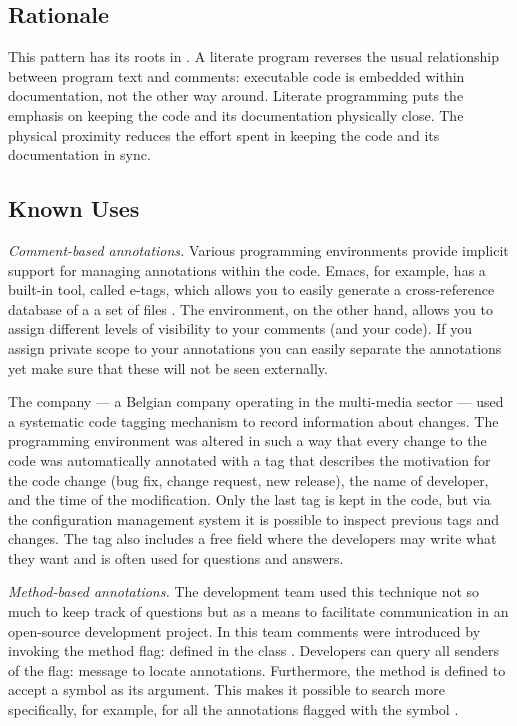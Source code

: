 \documentclass[a4paper,10pt,twoside]{book}
\begin{document}
\subsection*{Rationale}

This pattern has its roots in  \cite{Reen89a}\cite{Knut92a}. A literate program reverses the usual relationship between program text and comments: executable code is embedded within documentation, not the other way around. Literate programming puts the emphasis on keeping the code and its documentation physically close. The physical proximity reduces the effort spent in keeping the code and its documentation in sync.

\subsection*{Known Uses}

\emph{Comment-based annotations.}
Various programming environments provide implicit support for managing annotations within the code. Emacs, for example, has a built-in tool, called e-tags, which allows you to easily generate a cross-reference database of a a set of files \cite{Came96a}. The  environment, on the other hand, allows you to assign different levels of visibility to your comments (and your code). If you assign private scope to your annotations you can easily separate the annotations yet make sure that these will not be seen externally.

The company  --- a Belgian company operating in the multi-media sector --- used a systematic code tagging mechanism to record information about changes. The programming environment was altered in such a way that every change to the code was automatically annotated with a tag that describes the motivation for the code change (bug fix, change request, new release), the name of developer, and the time of the modification. Only the last tag is kept in the code, but via the configuration management system it is possible to inspect previous tags and changes. The tag also includes a free field where the developers may write what they want and is often used for questions and answers. 

\noindent
\emph{Method-based annotations.}
The  development team \cite{Inga97a} used this technique not so much to keep track of questions but as a means to facilitate communication in an open-source development project. In this team comments were introduced by invoking the method flag: defined in the class . Developers can query all senders of the flag: message to locate annotations. Furthermore, the method is defined to accept a symbol as its argument. This makes it possible to search more specifically, for example, for all the annotations flagged with the symbol .
\end{document}
